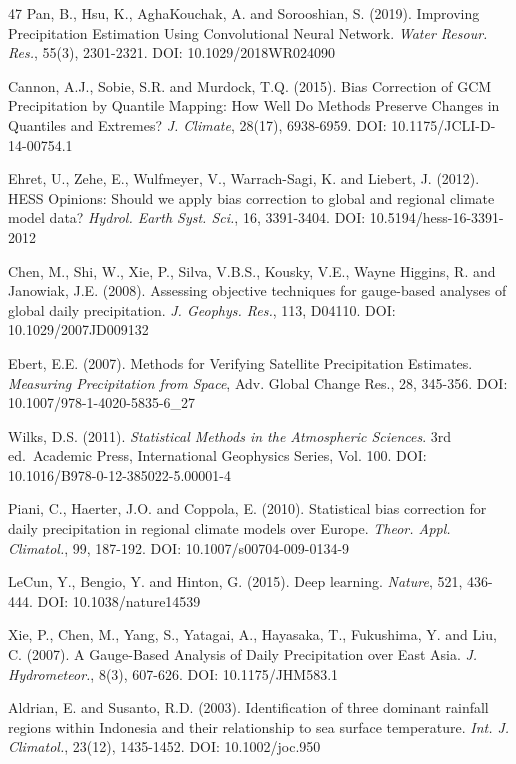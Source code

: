 \documentclass[11pt,a4paper]{article}
\begin{document}
\begin{thebibliography}{47}
 Pan, B., Hsu, K., AghaKouchak, A. and Sorooshian, S. (2019).
Improving Precipitation Estimation Using Convolutional Neural Network.
\emph{Water Resour. Res.}, 55(3), 2301-2321. DOI: 10.1029/2018WR024090

 Cannon, A.J., Sobie, S.R. and Murdock, T.Q. (2015). Bias
Correction of GCM Precipitation by Quantile Mapping: How Well Do Methods
Preserve Changes in Quantiles and Extremes? \emph{J. Climate}, 28(17),
6938-6959. DOI: 10.1175/JCLI-D-14-00754.1

 Ehret, U., Zehe, E., Wulfmeyer, V., Warrach-Sagi, K. and
Liebert, J. (2012). HESS Opinions: Should we apply bias correction to
global and regional climate model data? \emph{Hydrol. Earth Syst. Sci.},
16, 3391-3404. DOI: 10.5194/hess-16-3391-2012

 Chen, M., Shi, W., Xie, P., Silva, V.B.S., Kousky, V.E., Wayne
Higgins, R. and Janowiak, J.E. (2008). Assessing objective techniques
for gauge-based analyses of global daily precipitation. \emph{J.
Geophys. Res.}, 113, D04110. DOI: 10.1029/2007JD009132

 Ebert, E.E. (2007). Methods for Verifying Satellite
Precipitation Estimates. \emph{Measuring Precipitation from Space}, Adv.
Global Change Res., 28, 345-356. DOI: 10.1007/978-1-4020-5835-6\_27

 Wilks, D.S. (2011). \emph{Statistical Methods in the
Atmospheric Sciences}. 3rd ed.~Academic Press, International Geophysics
Series, Vol. 100. DOI: 10.1016/B978-0-12-385022-5.00001-4

 Piani, C., Haerter, J.O. and Coppola, E. (2010). Statistical
bias correction for daily precipitation in regional climate models over
Europe. \emph{Theor. Appl. Climatol.}, 99, 187-192. DOI:
10.1007/s00704-009-0134-9

 LeCun, Y., Bengio, Y. and Hinton, G. (2015). Deep learning.
\emph{Nature}, 521, 436-444. DOI: 10.1038/nature14539

 Xie, P., Chen, M., Yang, S., Yatagai, A., Hayasaka, T.,
Fukushima, Y. and Liu, C. (2007). A Gauge-Based Analysis of Daily
Precipitation over East Asia. \emph{J. Hydrometeor.}, 8(3), 607-626.
DOI: 10.1175/JHM583.1

 Aldrian, E. and Susanto, R.D. (2003). Identification of three
dominant rainfall regions within Indonesia and their relationship to sea
surface temperature. \emph{Int. J. Climatol.}, 23(12), 1435-1452. DOI:
10.1002/joc.950


\end{thebibliography}
\end{document}
